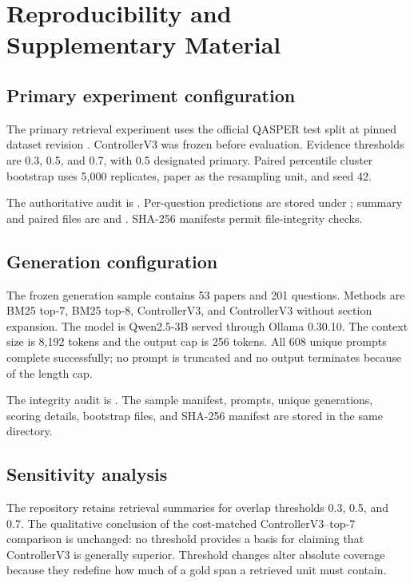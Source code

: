 \chapter{Reproducibility and Supplementary Material}

\section{Primary experiment configuration}

The primary retrieval experiment uses the official QASPER test split at pinned dataset revision . ControllerV3 was frozen before evaluation. Evidence thresholds are 0.3, 0.5, and 0.7, with 0.5 designated primary. Paired percentile cluster bootstrap uses 5,000 replicates, paper as the resampling unit, and seed 42.

The authoritative audit is . Per-question predictions are stored under ; summary and paired files are  and . SHA-256 manifests permit file-integrity checks.

\section{Generation configuration}

The frozen generation sample contains 53 papers and 201 questions. Methods are BM25 top-7, BM25 top-8, ControllerV3, and ControllerV3 without section expansion. The model is Qwen2.5-3B served through Ollama 0.30.10. The context size is 8,192 tokens and the output cap is 256 tokens. All 608 unique prompts complete successfully; no prompt is truncated and no output terminates because of the length cap.

The integrity audit is . The sample manifest, prompts, unique generations, scoring details, bootstrap files, and SHA-256 manifest are stored in the same directory.

\section{Sensitivity analysis}

The repository retains retrieval summaries for overlap thresholds 0.3, 0.5, and 0.7. The qualitative conclusion of the cost-matched ControllerV3--top-7 comparison is unchanged: no threshold provides a basis for claiming that ControllerV3 is generally superior. Threshold changes alter absolute coverage because they redefine how much of a gold span a retrieved unit must contain.

